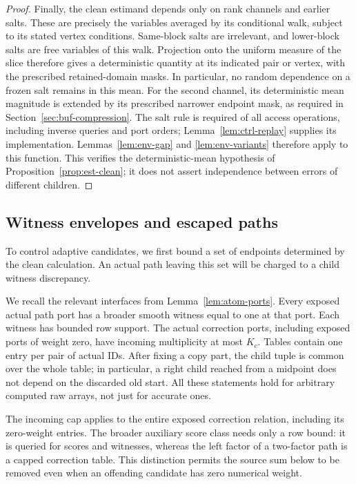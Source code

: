\begin{proof}
Finally, the clean estimand depends only on rank channels and earlier
salts.  These are precisely the variables averaged by its conditional
walk, subject to its stated vertex conditions.  Same-block salts are
irrelevant, and lower-block salts are free variables of this walk.
Projection onto the uniform measure of the slice therefore gives a
deterministic quantity at its indicated pair or vertex, with the
prescribed retained-domain masks.  In particular, no random dependence
on a frozen salt remains in this mean.  For the second channel, its
deterministic mean magnitude is extended by its prescribed narrower
endpoint mask, as required in Section~\ref{sec:buf-compression}.
The salt rule is required of all access operations, including inverse
queries and port orders; Lemma~\ref{lem:ctrl-replay} supplies its
implementation.  Lemmas~\ref{lem:env-gap} and \ref{lem:env-variants}
therefore apply to this function.  This verifies the deterministic-mean
hypothesis of Proposition~\ref{prop:est-clean}; it does not assert
independence between errors of different children.
\end{proof}

\subsection{Witness envelopes and escaped paths}

To control adaptive candidates, we first bound a set of endpoints
determined by the clean calculation.  An actual path leaving this set
will be charged to a child witness discrepancy.

We recall the relevant interfaces from Lemma~\ref{lem:atom-ports}.
Every exposed actual path port has a broader smooth witness equal to one
at that port.  Each witness has bounded row support.  The actual
correction ports, including exposed ports of weight zero, have incoming
multiplicity at most $K_c$.  Tables contain one entry per pair of actual
IDs.  After fixing a copy part, the child tuple is common over the whole
table; in particular, a right child reached from a midpoint does not
depend on the discarded old start.  All these statements hold for
arbitrary computed raw arrays, not just for accurate ones.

The incoming cap applies to the entire exposed correction relation,
including its zero-weight entries.  The broader auxiliary score class
needs only a row bound: it is queried for scores and witnesses, whereas
the left factor of a two-factor path is a capped correction table.
This distinction permits the source sum below to be removed even when
an offending candidate has zero numerical weight.

